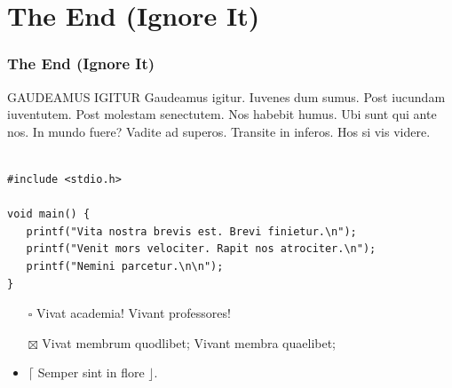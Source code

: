 \documentclass[xcolor=table, notheorems, hyperref={pdfpagelabels=false}]{beamer}
\begin{document}
\section{The End (Ignore It)}
\begin{frame}[fragile]
\frametitle{The End (Ignore It)}

\begin{block}{GAUDEAMUS IGITUR}
Gaudeamus igitur. Iuvenes dum sumus. Post iucundam iuventutem. Post molestam senectutem. Nos habebit humus. 
Ubi sunt qui ante nos. In mundo fuere? Vadite ad superos. Transite in inferos. Hos si vis videre. 
\end{block}

\begin{lstlisting}[basicstyle=\ttfamily\small]

#include <stdio.h>

void main() {
   printf("Vita nostra brevis est. Brevi finietur.\n");
   printf("Venit mors velociter. Rapit nos atrociter.\n");
   printf("Nemini parcetur.\n\n");
}

\end{lstlisting}

\begin{itemize}
\item[$\square$]   Vivat academia! Vivant professores!
\item[$\boxtimes$] Vivat membrum quodlibet; Vivant membra quaelibet;
\item              $\lceil$ Semper sint in flore $\rfloor$.
\end{itemize}

\end{frame}

\end{document}
